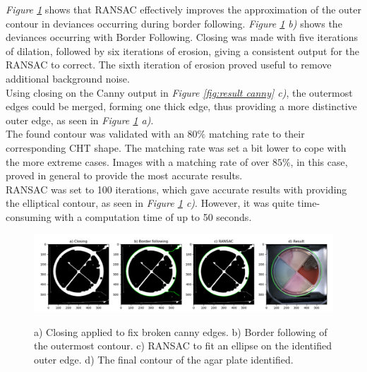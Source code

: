 \noindent\textit{Figure \ref{fig:result ransac}} shows that RANSAC effectively improves the approximation of the outer contour in deviances occurring during border following. \textit{Figure \ref{fig:result ransac} b)} shows the deviances occurring with Border Following. Closing was made with five iterations of dilation, followed by six iterations of erosion, giving a consistent output for the RANSAC to correct. The sixth iteration of erosion proved useful to remove additional background noise. \\

\noindent Using closing on the Canny output in \textit{Figure \ref{fig:result canny} c)}, the outermost edges could be merged, forming one thick edge, thus providing a more distinctive outer edge, as seen in \textit{Figure \ref{fig:result ransac} a)}.\\

\noindent The found contour was validated with an $ 80\%$ matching rate to their corresponding CHT shape. The matching rate was set a bit lower to cope with the more extreme cases. Images with a matching rate of over $ 85\%$, in this case, proved in general to provide the most accurate results.\\

\noindent RANSAC was set to 100 iterations, which gave accurate results with providing the elliptical contour, as seen in \textit{Figure \ref{fig:result ransac} c)}. However, it was quite time-consuming with a computation time of up to 50 seconds.


\begin{figure}[H]
    \centering
     \includegraphics[width=1\linewidth]{figures/PDF/Ransac.pdf}\\
    \caption{a) Closing applied to fix broken canny edges. b) Border following of the outermost contour. c) RANSAC to fit an ellipse on the identified outer edge. d) The final contour of the agar plate identified.}
    \label{fig:result ransac}
\end{figure}



